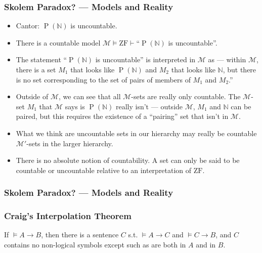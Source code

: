 \documentclass[UTF8,11pt,colorlinks,compress,openany]{beamer}%
\begin{document}
\begin{frame}\frametitle{Skolem Paradox? --- Models and Reality}
	\begin{itemize}
		\item Cantor: $\operatorname{P}(\mathbb{N})$ is uncountable.
		\item There is a countable model $\mathcal{M}\vDash \mathrm{ZF}\vdash$``$\operatorname{P}(\mathbb{N})$ is uncountable''.
		\item The statement ``$\operatorname{P}(\mathbb{N})$ is uncountable'' is interpreted in $\mathcal{M}$ as --- within $\mathcal{M}$, there is a set $M_1$ that looks like $\operatorname{P}(\mathbb{N})$ and $M_2$ that looks like $\mathbb{N}$, but there is no set corresponding to the set of pairs of members of $M_1$ and $M_2$.''
		\item Outside of $\mathcal{M}$, we can see that all $\mathcal{M}$-sets are really only countable. The $\mathcal{M}$-set $M_1$ that $\mathcal{M}$ says is $\operatorname{P}(\mathbb{N})$ really isn't --- outside $\mathcal{M}$, $M_1$ and $\mathbb{N}$ can be paired, but this requires the existence of a ``pairing'' set that isn't in $\mathcal{M}$.
		\item What we think are uncountable sets in our hierarchy may really be countable $\mathcal{M}'$-sets in the larger hierarchy.
		\item There is no absolute notion of countability. A set can only be said to be countable or uncountable relative to an interpretation of $\mathrm{ZF}$.
	\end{itemize}
\end{frame}

\begin{frame}\frametitle{Skolem Paradox? --- Models and Reality}\centering
{}
\end{frame}

\begin{frame}\frametitle{Craig's Interpolation Theorem}
	\begin{theorem}
		If $\vDash A\to B$, then there is a
		sentence $C$ s.t. $\vDash A\to C$ and $\vDash C\to B$, and $C$ contains no non-logical symbols except such as are both in $A$ and in $B$.
	\end{theorem}
\end{frame}
\end{document}
